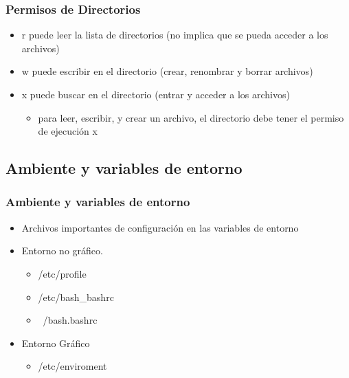 \documentclass{beamer}
\begin{document}
\begin{frame}
\frametitle{Permisos de Directorios}
\begin{itemize}
\item r puede leer la lista de directorios (no implica que se pueda acceder a los archivos)
\item w puede escribir en el directorio (crear, renombrar y borrar archivos)
\item x puede buscar en el directorio (entrar y acceder a los archivos)
	\begin{itemize}
	\item para leer, escribir, y crear un archivo, el directorio debe tener el permiso de ejecuci\'on x
	\end{itemize}
\end{itemize}
\end{frame}
\subsection{Ambiente y variables de entorno}
\begin{frame}
	\frametitle{Ambiente y variables de entorno}
	\begin{itemize}
		\item Archivos importantes de configuraci\'on en las variables de entorno
		\item Entorno no gr\'afico.
			\begin{itemize}
			\item /etc/profile
			\item /etc/bash\_bashrc
			\item ~/bash.bashrc
			\end{itemize}
		\item Entorno Gr\'afico
			\begin{itemize}
			\item /etc/enviroment
			\end{itemize}
	\end{itemize}
\end{frame} 
\end{document}
